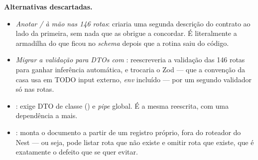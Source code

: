 \textbf{Alternativas descartadas.}
\begin{itemize}
  \item \emph{Anotar / à mão nas 146 rotas}: criaria
    uma segunda descrição do contrato ao lado da primeira, sem nada que as
    obrigue a concordar. É literalmente a armadilha do  que ficou
    no \emph{schema} depois que a rotina saiu do código.
  \item \emph{Migrar a validação para DTOs com }: reescreveria
    a validação das 146 rotas para ganhar inferência automática, e trocaria o Zod
    --- que a convenção da casa usa em TODO input externo, \emph{env} incluído ---
    por um segundo validador só nas rotas.
  \item \emph{}: exige DTO de classe () e
    \emph{pipe} global. É a mesma reescrita, com uma dependência a mais.
  \item \emph{}: monta o documento a partir de
    um registro próprio, fora do roteador do Nest --- ou seja, pode listar rota
    que não existe e omitir rota que existe, que é exatamente o defeito que se
    quer evitar.
\end{itemize}

